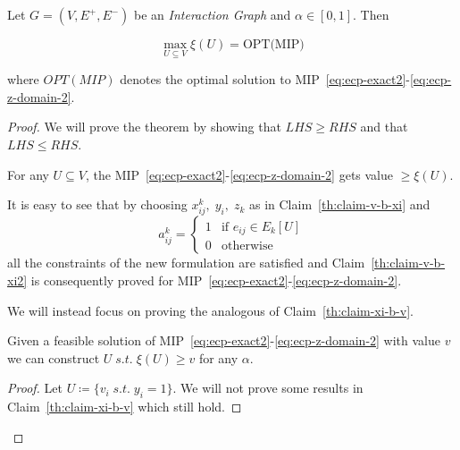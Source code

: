 \begin{theorem}
	\label{th:ecp-mip}
	Let $G = (V, E^{+}, E^{-})$ be an \emph{Interaction Graph} and $\alpha \in
		[0, 1]$. Then

	\begin{equation}
		\max_{U \subseteq V} \xi(U) = \text{OPT(MIP)}
	\end{equation}

	where $OPT(MIP)$ denotes the optimal solution to
	MIP~\eqref{eq:ecp-exact2}-\eqref{eq:ecp-z-domain-2}.
\end{theorem}
\begin{proof}
	We will prove the theorem by showing that $LHS \geq RHS$ and that $LHS \leq
		RHS$.
	\begin{claim}
		\label{th:claim-v-b-xi2}
		For any $U \subseteq V$, the
		MIP~\eqref{eq:ecp-exact2}-\eqref{eq:ecp-z-domain-2} gets value $\geq \xi(U)$.
	\end{claim}

	It is easy to see that by choosing $x_{ij}^{k}, \; y_i, \; z_k$ as in
	Claim~\ref{th:claim-v-b-xi} and
	\begin{equation*}
		a_{ij}^{k} = \begin{cases}
			1 & \text{if } e_{ij} \in E_k[U] \\
			0 & \text{otherwise}
		\end{cases}
	\end{equation*}
	all the constraints of the new formulation are satisfied and
	Claim~\ref{th:claim-v-b-xi2} is consequently proved for
	MIP~\eqref{eq:ecp-exact2}-\eqref{eq:ecp-z-domain-2}.

	We will instead focus on proving the analogous of Claim~\ref{th:claim-xi-b-v}.
	\begin{claim}
		\label{th:claim-xi-b-v2}
		Given a feasible solution of
		MIP~\eqref{eq:ecp-exact2}-\eqref{eq:ecp-z-domain-2} with value $v$ we can
		construct $U \; s.t. \; \xi(U) \geq v$ for any $\alpha$.
	\end{claim}

	\begin{proof}
		Let $U \coloneqq \{ v_i \; s.t. \; y_i = 1\} $. We will not prove
		some results in Claim~\ref{th:claim-xi-b-v} which still hold.


\end{proof}
\end{proof}
